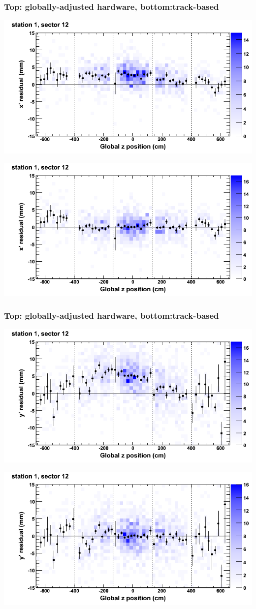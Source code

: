 \documentclass[compress]{beamer}
\begin{document}
\begin{frame}
\frametitle{Top: globally-adjusted hardware, bottom:track-based}
\includegraphics[width=0.7\linewidth]{NOV4_mapplots_HW/DTvsz_st1sec12_x.png}

\includegraphics[width=0.7\linewidth]{NOV4_mapplots/DTvsz_st1sec12_x.png}
\end{frame}

\begin{frame}
\frametitle{Top: globally-adjusted hardware, bottom:track-based}
\includegraphics[width=0.7\linewidth]{NOV4_mapplots_HW/DTvsz_st1sec12_y.png}

\includegraphics[width=0.7\linewidth]{NOV4_mapplots/DTvsz_st1sec12_y.png}
\end{frame}
\end{document}
